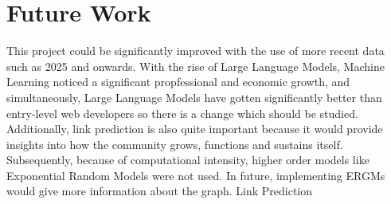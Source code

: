 \documentclass[letterpaper]{article}
\begin{document}
\section{Future Work}
This project could be significantly improved with the use of more recent data such as 2025 and onwards. With the rise of Large Language Models, Machine Learning noticed a significant propfessional and economic growth, and simultaneously, Large Language Models have gotten significantly better than entry-level web developers so there is a change which should be studied. Additionally, link prediction is also quite important because it would provide insights into how the community grows, functions and sustains itself. Subsequently, because of computational intensity, higher order models like Exponential Random Models were not used. In future, implementing ERGMs would give more information about the graph.
Link Prediction
\nocite{*}


\end{document}
